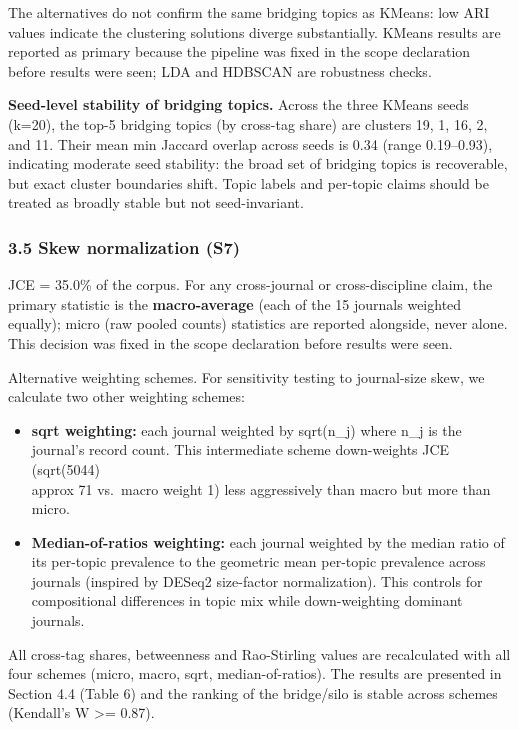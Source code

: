 \documentclass[pdflatex,sn-apa]{sn-jnl}
\providecommand{\tightlist}{\setlength{\itemsep}{0pt}\setlength{\parskip}{0pt}}
\begin{document}
The alternatives do not confirm the same bridging topics as KMeans: low
ARI values indicate the clustering solutions diverge substantially.
KMeans results are reported as primary because the pipeline was fixed in
the scope declaration before results were seen; LDA and HDBSCAN are
robustness checks.

\textbf{Seed-level stability of bridging topics.} Across the three
KMeans seeds (k=20), the top-5 bridging topics (by cross-tag share) are
clusters 19, 1, 16, 2, and 11. Their mean min Jaccard overlap across
seeds is 0.34 (range 0.19--0.93), indicating moderate seed stability:
the broad set of bridging topics is recoverable, but exact cluster
boundaries shift. Topic labels and per-topic claims should be treated as
broadly stable but not seed-invariant.

\subsubsection{3.5 Skew normalization (S7)}\label{skew-normalization-s7}

JCE = 35.0\% of the corpus. For any cross-journal or cross-discipline
claim, the primary statistic is the \textbf{macro-average} (each of the
15 journals weighted equally); micro (raw pooled counts) statistics are
reported alongside, never alone. This decision was fixed in the scope
declaration before results were seen.

Alternative weighting schemes. For sensitivity testing to journal-size
skew, we calculate two other weighting schemes:

\begin{itemize}
\tightlist
\item
  \textbf{sqrt weighting:} each journal weighted by sqrt(n\_j) where
  n\_j is the journal's record count. This intermediate scheme
  down-weights JCE (sqrt(5044) \\approx 71 vs.~macro weight 1) less
  aggressively than macro but more than micro.
\item
  \textbf{Median-of-ratios weighting:} each journal weighted by the
  median ratio of its per-topic prevalence to the geometric mean
  per-topic prevalence across journals (inspired by DESeq2 size-factor
  normalization). This controls for compositional differences in topic
  mix while down-weighting dominant journals.
\end{itemize}

All cross-tag shares, betweenness and Rao-Stirling values are
recalculated with all four schemes (micro, macro, sqrt,
median-of-ratios). The results are presented in Section 4.4 (Table 6)
and the ranking of the bridge/silo is stable across schemes (Kendall's W
\textgreater= 0.87).
\end{document}
